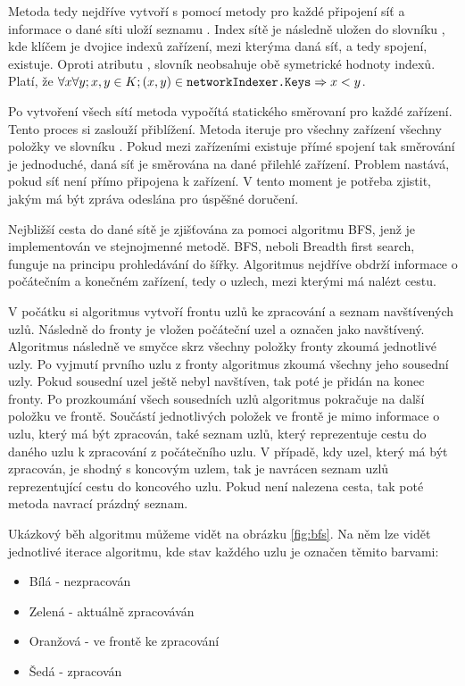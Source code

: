 Metoda tedy nejdříve vytvoří s pomocí metody  pro každé připojení síť a informace o dané síti uloží seznamu . Index sítě je následně uložen do slovníku , kde klíčem je dvojice indexů zařízení, mezi kterýma daná síť, a tedy spojení, existuje. Oproti atributu , slovník neobsahuje obě symetrické hodnoty indexů. Platí, že $\forall x \forall y; x,y\in K; (x,y) \in \texttt{networkIndexer.Keys} \Rightarrow x < y$. 

Po vytvoření všech sítí metoda vypočítá statického směrovaní pro každé zařízení. Tento proces si zaslouží přiblížení. Metoda iteruje pro všechny zařízení všechny položky ve slovníku . Pokud mezi zařízeními existuje přímé spojení tak směrování je jednoduché, daná síť je směrována na dané přilehlé zařízení. Problem nastává, pokud síť není přímo připojena k zařízení. V tento moment je potřeba zjistit, jakým  má být zpráva odeslána pro úspěšné doručení.

Nejbližší cesta do dané sítě je zjišťována za pomoci algoritmu BFS, jenž je implementován ve stejnojmenné metodě. BFS, neboli Breadth first search, funguje na principu prohledávání do šířky. Algoritmus nejdříve obdrží informace o počátečním a konečném zařízení, tedy o uzlech, mezi kterými má nalézt cestu. 

V počátku si algoritmus vytvoří frontu uzlů ke zpracování a seznam navštívených uzlů. Následně do fronty je vložen počáteční uzel a označen jako navštívený. Algoritmus následně ve smyčce skrz všechny položky fronty zkoumá jednotlivé uzly. Po vyjmutí prvního uzlu z fronty algoritmus zkoumá všechny jeho sousední uzly. Pokud sousední uzel ještě nebyl navštíven, tak poté je přidán na konec fronty. Po prozkoumání všech sousedních uzlů algoritmus pokračuje na další položku ve frontě. Součástí jednotlivých položek ve frontě je mimo informace o uzlu, který má být zpracován, také seznam uzlů, který reprezentuje cestu do daného uzlu k zpracování z počátečního uzlu. V případě, kdy uzel, který má být zpracován, je shodný s koncovým uzlem, tak je navrácen seznam uzlů reprezentující cestu do koncového uzlu. Pokud není nalezena cesta, tak poté metoda navrací prázdný seznam.

Ukázkový běh algoritmu můžeme vidět na obrázku \ref{fig:bfs}. Na něm lze vidět jednotlivé iterace algoritmu, kde stav každého uzlu je označen těmito barvami:

\begin{itemize}
    \item Bílá - nezpracován
    \item Zelená - aktuálně zpracováván
    \item Oranžová - ve frontě ke zpracování
    \item Šedá - zpracován
\end{itemize}

